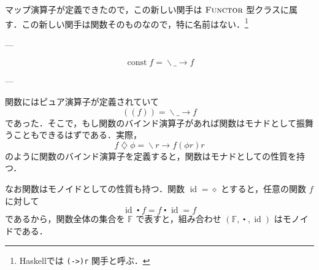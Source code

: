 \documentclass[a4paper,twocolumn]{jsbook}
\def\({\left(\!\left(}
\def\){\right)\!\right)}
\newcommand{\programminglanguage}[1]{\textsf{#1}}
\newcommand{\haskell}{\programminglanguage{Haskell}}
\newcommand{\code}[1]{\texttt{#1}}
\newcommand{\mAnonParam}{\diamond}
\newcommand{\mAnyParam}{\_}
\DeclareMathOperator{\mConst}{const}
\DeclareMathOperator{\mId}{id}
\DeclareMathOperator{\mAppMap}{\times}
\DeclareMathOperator{\mAppMapFunc}{\bowtie}
\DeclareMathOperator{\mBindFunc}{\diamondsuit}
\DeclareMathOperator{\mComp}{\centerdot}
\DeclareMathOperator{\mIn}{{:\!:}}
\DeclareMathOperator{\mLambda}{\backslash}
\DeclareMathOperator{\mLambdaArrow}{\rightarrow}
\DeclareMathOperator{\mMap}{\bullet}
\DeclareMathOperator{\mMapFunc}{\circ}
\DeclareMathOperator{\mMapsTo}{\mapsto}
\newcommand{\mSpecialSet}[1]{\mathbb{#1}} %
\newcommand{\mFSet}{\mSpecialSet{F}}
\newcommand{\mType}[1]{\mathbf{#1}}
\newcommand{\mFuncWith}[1]{\(#1\)}
\newcommand{\mPureWith}[1]{\langle#1\rangle}
\newcommand{\mTupleWith}[1]{\left(#1\right)}
\newcommand{\mFuncType}[1]{\(\mType{#1}\)_\mType{r}}
\newcommand{\mSpecialTypeClass}[1]{\textsc{#1}} %
\newcommand{\mFunctorTypeClass}{\mSpecialTypeClass{Functor}}
\newcommand{\mLambdaExp}[2]{\mLambda{#1}\mLambdaArrow{#2}}
\newcommand{\mProj}[2]{#1\mMapsTo#2}
\begin{document}
マップ演算子が定義できたので，この新しい関手は $\mFunctorTypeClass$ 型クラスに属す．この新しい関手は関数そのものなので，特に名前はない．\footnote{\haskell では \code{(->)r} 関手と呼ぶ．}



---

$$\mConst f=\mLambdaExp{\mAnyParam}{f}$$

---

関数にはピュア演算子が定義されていて
\begin{equation}
\mFuncWith{f}=\mLambdaExp{\mAnyParam}{f}
\end{equation}
であった．そこで，もし関数のバインド演算子があれば関数はモナドとして振舞うこともできるはずである．実際，
\begin{equation}
f\mBindFunc\phi=\mLambdaExp{r}{f(\phi r)r}
\end{equation}
のように関数のバインド演算子を定義すると，関数はモナドとしての性質を持つ．

なお関数はモノイドとしての性質も持つ．関数 $\mId=\mAnonParam$ とすると，任意の関数 $f$ に対して
\begin{equation}
\mId\mComp f=f\mComp\mId=f
\end{equation}
であるから，関数全体の集合を $\mFSet$ で表すと，組み合わせ $\mTupleWith{\mFSet,\mComp,\mId}$ はモノイドである．
\end{document}
